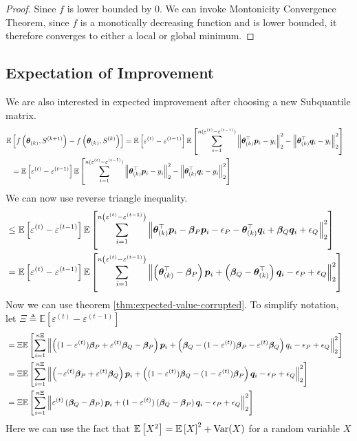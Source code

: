 \documentclass{article} %
\newcommand{\norm}[1]{\left\lVert#1\right\rVert}
\begin{document}
\begin{appendices}
\begin{proof}
	Since $f$ is lower bounded by $0$. We can invoke Montonicity Convergence Theorem, since $f$ is a monotically decreasing function and is lower bounded, it therefore converges to either a local or global minimum. 
	\end{proof}
	
	\subsection{Expectation of Improvement}
	We are also interested in expected improvement after choosing a new Subquantile matrix. 
	\begin{align*}
		\mathbb{E}&\left[f\left(\vtheta_{(k)}, S^{(k+1)}\right) - f\left(\vtheta_{(k)}, S^{(k)}\right)\right] = \mathbb{E}\left[\varepsilon^{(t)} - \varepsilon^{(t-1)}\right]\mathbb{E}\left[\sum_{i=1}^{n(\varepsilon^{(t)}-\varepsilon^{(t-1)})}\norm{\vtheta_{(k)}^\top\vp_i -y_i}_2^2 - \norm{\vtheta_{(k)}^\top\vq_i - y_i}_2^2\right] &&\\
		&= \mathbb{E}\left[\varepsilon^{(t)} - \varepsilon^{(t-1)}\right]\mathbb{E}\left[\sum_{i=1}^{n(\varepsilon^{(t)}-\varepsilon^{(t-1)})}\norm{\vtheta_{(k)}^\top\vp_i -y_i}_2^2 - \norm{\vtheta_{(k)}^\top\vq_i - y_i}_2^2\right] &&
	\end{align*}
	We can now use reverse triangle inequality.
	\begin{align*}
		&\leq \mathbb{E}\left[\varepsilon^{(t)} - \varepsilon^{(t-1)}\right] \mathbb{E}\left[\sum_{i=1}^{n\left(\varepsilon^{(t)}-\varepsilon^{(t-1)}\right)}\norm{\vtheta_{(k)}^\top\vp_i - \vbeta_P\vp_i - \eps_P - \vtheta^\top_{(k)}\vq_i + \vbeta_Q\vq_i + \eps_Q}_2^2 \right] &&\\
		&= \mathbb{E}\left[\varepsilon^{(t)} - \varepsilon^{(t-1)}\right] \mathbb{E}\left[\sum_{i=1}^{n\left(\varepsilon^{(t)}-\varepsilon^{(t-1)}\right)}\norm{\left(\vtheta^\top_{(k)} - \vbeta_P\right)\vp_i + \left(\vbeta_Q - \vtheta^\top_{(k)}\right)\vq_i - \eps_P+ \eps_Q}_2^2 \right] &&
	\end{align*}
	Now we can use theorem \ref{thm:expected-value-corrupted}. To simplify notation, let $\Xi \triangleq \mathbb{E}\left[\varepsilon^{(t)} - \varepsilon^{(t-1)}\right]$
	\begin{align*}
		&= \Xi \mathbb{E}\left[\sum_{i=1}^{n\Xi}\norm{\left((1-\varepsilon^{(t)})\vbeta_P + \varepsilon^{(t)}\vbeta_Q - \vbeta_P\right)\vp_i + \left(\vbeta_Q - (1 - \varepsilon^{(t)})\vbeta_P - \varepsilon^{(t)}\vbeta_Q \right)q_i - \eps_P+ \eps_Q}_2^2 \right] &&\\
		&= \Xi \mathbb{E}\left[\sum_{i=1}^{n\Xi}\norm{\left(-\varepsilon^{(t)}\vbeta_P + \varepsilon^{(t)}\vbeta_Q\right)\vp_i + \left((1 - \varepsilon^{(t)})\vbeta_Q - (1 - \varepsilon^{(t)})\vbeta_P\right)\vq_i - \eps_P+ \eps_Q}_2^2 \right] &&\\
		&= \Xi \mathbb{E}\left[\sum_{i=1}^{n\Xi}\norm{\varepsilon^{(t)}\left(\vbeta_Q - \vbeta_P\right)\vp_i + (1 - \varepsilon^{(t)})\left(\vbeta_Q - \vbeta_P\right)\vq_i - \eps_P+ \eps_Q}_2^2 \right] &&
	\end{align*}
	Here we can use the fact that $\mathbb{E}\left[X^2\right] = \mathbb{E}\left[X\right]^2 + \mathrm{Var}(X)$ for a random variable $X$


\end{appendices}
\end{document}
